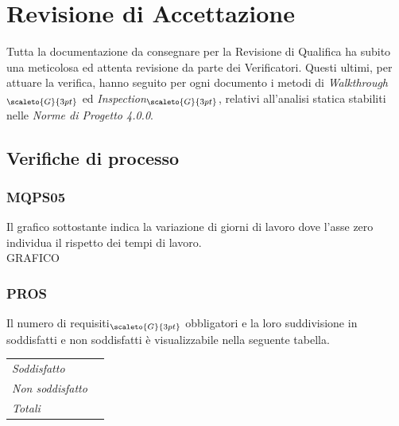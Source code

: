 {{{{{{{{{{{{{\section{Revisione di Accettazione}\label{ResocontoAttivitàDiVerificaRevisioneDiAccettazione}
Tutta la documentazione da consegnare per la Revisione di Qualifica ha subito una meticolosa ed attenta revisione da parte dei Verificatori. Questi ultimi, per attuare la verifica, hanno seguito per ogni documento i metodi di \textit{Walkthrough}$_{\scaleto{G}{3pt}}$ ed \textit{Inspection}$_{\scaleto{G}{3pt}}$, relativi all'analisi statica stabiliti nelle \textit{Norme di Progetto 4.0.0}.

\subsection{Verifiche di processo}\label{ResocontoAttivitàDiVerificaRevisioneDiAccettazioneVerificheDiProcesso}

\subsubsection{MQPS05}\label{ResocontoAttivitàDiVerificaRevisioneDiAccettazioneVerificheDiProcessoMPQS05}

Il grafico sottostante indica la variazione di giorni di lavoro dove l'asse zero individua il rispetto dei tempi di lavoro. \\
GRAFICO



\subsubsection{PROS}\label{ResocontoAttivitàDiVerificaRevisioneDiAccettazioneVerificheDiProcessoPROS}

Il numero di requisiti$_{\scaleto{G}{3pt}}$ obbligatori e la loro suddivisione in soddisfatti e non soddisfatti è visualizzabile nella seguente tabella.

\quad
\def\tabularxcolumn#1{m{#1}}
{
	\begin{center}
		\renewcommand{\arraystretch}{1.4}
		\begin{longtable}[c]{|p{4cm}|p{3cm}|}
			\hline
			\rowcolor{airforceblue}
			\makecell[c]{\textbf{Realizzazione}} & \makecell[c]{\textbf{Quantità}}\\
			\hline
			\textit{Soddisfatto} & \makecell[c]{46}\\
			\hline
			\textit{Non soddisfatto} & \makecell[c]{0} \\
			\hline
			\textit{Totali} & \makecell[c]{46} \\
		\end{longtable}
	\end{center}
	
}}}}}}}}}}}}}}
